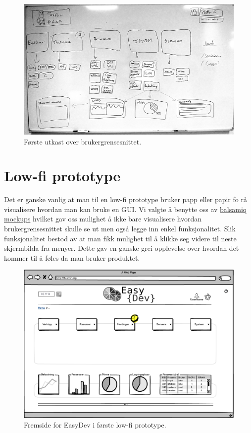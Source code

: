 \begin{figure}
\includegraphics[width=\textwidth,height=\textheight,keepaspectratio]{./img/prosessdokumentasjon/foersteutkast/foerste.jpg}
\caption[Første utkast]{Første utkast over brukergrensesnittet.}
\label{fig:foersteutkast}
\end{figure}

\section{Low-fi prototype}
Det er ganske vanlig at man til en low-fi prototype bruker papp eller papir fo rå visualisere hvordan man kan bruke en GUI. Vi valgte å benytte oss av \href{http://balsamiq.com/products/mockups/}{balsamiq mockups} hvilket gav oss mulighet å ikke bare visualisere hvordan brukergrensesnittet skulle se ut men også legge inn enkel funksjonalitet. Slik funksjonalitet bestod av at man fikk mulighet til å klikke seg videre til neste skjermbilda fra menyer. Dette gav en ganske grei opplevelse over hvordan det kommer til å føles da man bruker produktet.

\begin{figure}
\includegraphics[width=\textwidth,height=\textheight,keepaspectratio]{./img/prosessdokumentasjon/lowfi/fremside.png}
\caption[Low-fi prototype]{Fremside for EasyDev i første low-fi prototype.}
\label{fig:lowfi_fremside}
\end{figure}

